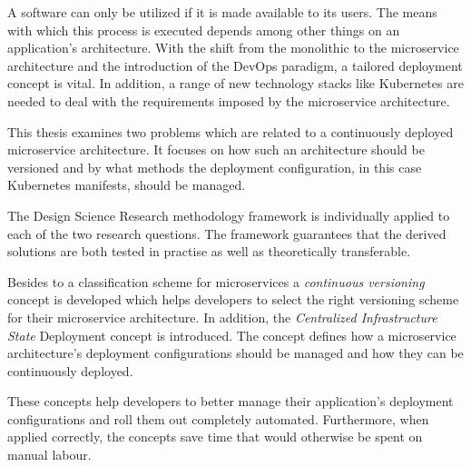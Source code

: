 
A software can only be utilized if it is made available to its users. The means
with which this process is executed depends among other things on an
application's architecture. With the shift from the monolithic to the
microservice architecture and the introduction of the DevOps paradigm, a
tailored deployment concept is vital. In addition, a range of new technology
stacks like Kubernetes are needed to deal with the requirements imposed by the
microservice architecture.

This thesis examines two problems which are related to a continuously deployed
microservice architecture. It focuses on how such an architecture should be
versioned and by what methods the deployment configuration, in this case
Kubernetes manifests, should be managed.

The Design Science Research methodology framework is individually applied to
each of the two research questions. The framework guarantees that the derived
solutions are both tested in practise as well as theoretically transferable.

Besides to a classification scheme for microservices a \textit{continuous
versioning} concept is developed which helps developers to select the right
versioning scheme for their microservice architecture. In addition, the
\textit{Centralized Infrastructure State}  Deployment concept is introduced.
The concept defines how a microservice architecture's deployment configurations
should be managed and how they can be continuously deployed.

These concepts help developers to better manage their application's deployment
configurations and roll them out completely automated. Furthermore, when
applied correctly, the concepts save time that would otherwise be spent on
manual labour.
